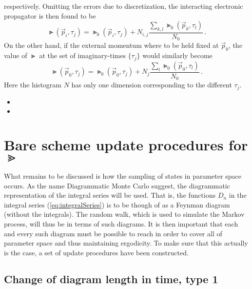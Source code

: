 respectively. Omitting the errors due to discretization, the interacting electronic propagator is then found to be
\begin{equation}
	\label{eq:GtofTandP}
	\Gt(\vec p_i, \tau_j)
	=
	\Gt_0(\vec p_i, \tau_j) + N_{i, j} \frac{\sum_{k, l} \Gt_0(\vec p_k, \tau_l)}{N_0} \,.
\end{equation}
On the other hand, if the external momentum where to be held fixed at $ \vec p_0 $, the value of $ \Gt $ at the set of imaginary-times $ \{ \tau_j \} $ would similarly become
\begin{equation}
	\label{eq:GtofT}
	\Gt(\vec p_0, \tau_j) = \Gt_0(\vec p_0, \tau_j) + N_j \frac{\sum_l \Gt_0(\vec p_0, \tau_l)}{N_0} \,.
\end{equation}
Here the histogram $ N $ has only one dimension corresponding to the different $ \tau_j $.


\begin{itemize}
	\item {}

	\item {}
\end{itemize}

\section{Bare scheme update procedures for $ \Gt$}
\label{eq:secSampleGBare}

What remains to be discussed is how the sampling of states in parameter space occurs. As the name Diagrammatic Monte Carlo suggest, the diagrammatic representation of the integral series will be used. That is, the functions $ D_n $ in the integral series (\ref{eq:integralSeries}) is to be though of as a Feynman diagram (without the integrals). The random walk, which is used to simulate the Markov process, will thus be in terms of such diagrams. It is then important that each and every such diagram must be possible to reach in order to cover all of parameter space and thus maintaining ergodicity. To make sure that this actually is the case, a set of update procedures \cite{MishchenkoA.2000DqMC} have been constructed.


\subsection*{Change of diagram length in time, type 1}

